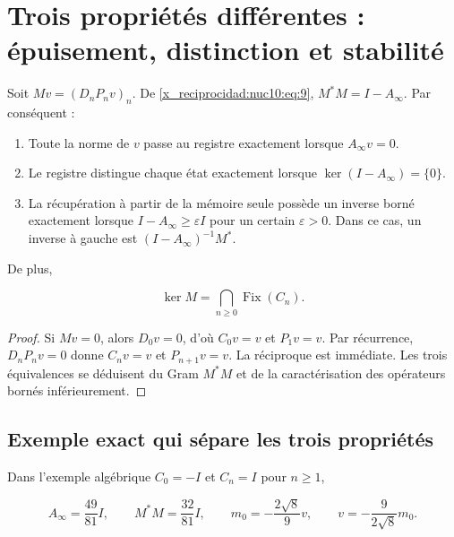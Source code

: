 \section{Trois propriétés différentes : épuisement, distinction et stabilité}

Soit \(Mv=(D_nP_nv)_n\). De \eqref{x_reciprocidad:nuc10:eq:9}, \(M^*M=I-A_\infty\). Par conséquent :

\begin{enumerate}
\item Toute la norme de \(v\) passe au registre exactement lorsque \(A_\infty v=0\).
\item Le registre distingue chaque état exactement lorsque \(\ker(I-A_\infty)=\{0\}\).
\item La récupération à partir de la mémoire seule possède un inverse borné exactement lorsque
\(I-A_\infty\geq\varepsilon I\) pour un certain \(\varepsilon>0\).
Dans ce cas, un inverse à gauche est \((I-A_\infty)^{-1}M^*\).
\end{enumerate}

De plus,



\begin{equation}
\boxed{\ker M=\bigcap_{n\ge0}\operatorname{Fix}(C_n).}
\label{x_reciprocidad:nuc10:eq:12}
\end{equation}



\begin{proof}
Si \(Mv=0\), alors \(D_0v=0\), d’où \(C_0v=v\)
et \(P_1v=v\). Par récurrence, \(D_nP_nv=0\) donne \(C_nv=v\) et
\(P_{n+1}v=v\). La réciproque est immédiate. Les trois équivalences se
déduisent du Gram \(M^*M\) et de la caractérisation des opérateurs
bornés inférieurement.
\end{proof}

\subsection{Exemple exact qui sépare les trois propriétés}

Dans l’exemple algébrique \(C_0=-I\) et \(C_n=I\) pour \(n\geq1\),



\begin{equation}
A_\infty=\frac{49}{81}I,\qquad M^*M=\frac{32}{81}I,
\qquad m_0=-\frac{2\sqrt8}{9}v,
\qquad v=-\frac9{2\sqrt8}m_0.
\label{x_reciprocidad:nuc10:eq:13}
\end{equation}



